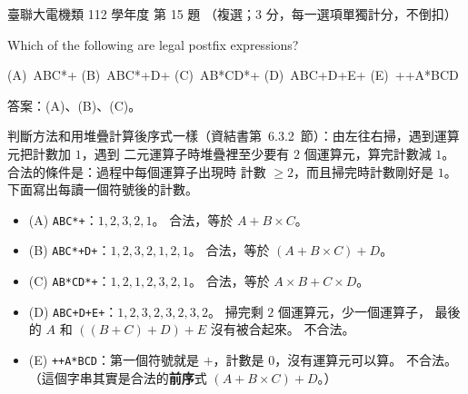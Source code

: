 \begin{pastexam}[label={px:ust-112-ee-ds-15}]{臺聯大電機類 112 學年度 第 15 題}
（複選；3 分，每一選項單獨計分，不倒扣）

Which of the following are legal postfix expressions?

(A)~ABC*+ \qquad (B)~ABC*+D+ \qquad (C)~AB*CD*+ \qquad (D)~ABC+D+E+ \qquad (E)~++A*BCD
\end{pastexam}

\begin{pastsoln}
答案：(A)、(B)、(C)。

判斷方法和用堆疊計算後序式一樣（資結書第~6.3.2~節）：由左往右掃，遇到運算元把計數加 $1$，遇到
二元運算子時堆疊裡至少要有 $2$ 個運算元，算完計數減 $1$。 合法的條件是：過程中每個運算子出現時
計數 $\ge 2$，而且掃完時計數剛好是 $1$。 下面寫出每讀一個符號後的計數。

\begin{itemize}
\item (A) \texttt{ABC*+}：$1, 2, 3, 2, 1$。 合法，等於 $A + B \times C$。
\item (B) \texttt{ABC*+D+}：$1, 2, 3, 2, 1, 2, 1$。 合法，等於 $(A + B \times C) + D$。
\item (C) \texttt{AB*CD*+}：$1, 2, 1, 2, 3, 2, 1$。 合法，等於 $A \times B + C \times D$。
\item (D) \texttt{ABC+D+E+}：$1, 2, 3, 2, 3, 2, 3, 2$。 掃完剩 $2$ 個運算元，少一個運算子，
最後的 $A$ 和 $((B + C) + D) + E$ 沒有被合起來。 不合法。
\item (E) \texttt{++A*BCD}：第一個符號就是 $+$，計數是 $0$，沒有運算元可以算。 不合法。
（這個字串其實是合法的\textbf{前序}式 $(A + B \times C) + D$。）
\end{itemize}
\end{pastsoln}
